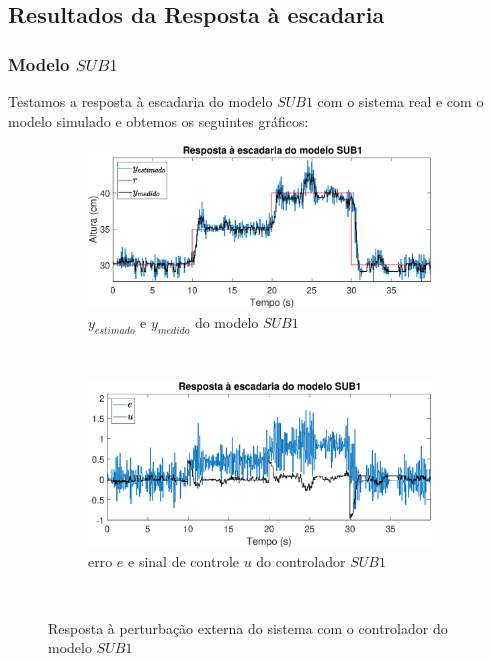 \subsection{Resultados da Resposta à escadaria}\label{rstair}

\subsubsection{Modelo $SUB1$}
Testamos a resposta à escadaria do modelo $SUB1$ com o sistema real e com o modelo simulado e obtemos os seguintes gráficos:
\begin{figure}[htb]
	\centering
	\begin{subfigure}[t]{0.48\textwidth}
		\includegraphics[width=1\linewidth]{stairrsub1y}
		\caption[$y_{estimado}$ e $y_{medido}$ do modelo $SUB1$]{$y_{estimado}$ e $y_{medido}$ do modelo $SUB1$}
		\label{fig:stairrsub1y}
	\end{subfigure}
	~ %
	\begin{subfigure}[t]{0.48\textwidth}
		\includegraphics[width=1\linewidth]{stairrsub1e}
		\caption[erro $e$ e sinal de controle $u$ do controlador $SUB1$]{erro $e$ e sinal de controle $u$ do controlador $SUB1$}
		\label{fig:stairrsub1e}
	\end{subfigure}
	~ %
	
	\caption{Resposta à perturbação externa do sistema com o controlador do modelo $SUB1$}\label{fig:stairrsub1}
\end{figure}

